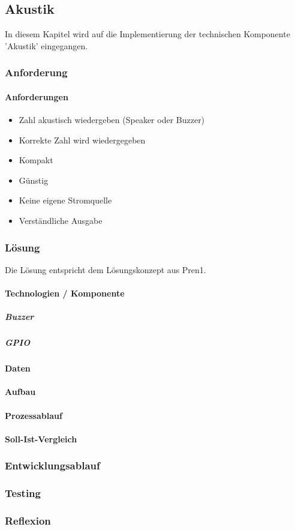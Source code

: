 \documentclass[../../main.tex]{subfiles}
\begin{document}
\subsection{Akustik}
In diesem Kapitel wird auf die Implementierung der technischen Komponente 'Akustik' eingegangen.
\subsubsection{Anforderung}

\paragraph{Anforderungen}
\begin{itemize}
    \item Zahl akustisch wiedergeben (Speaker oder Buzzer)
    \item Korrekte Zahl wird wiedergegeben
    \item Kompakt
    \item Günstig
    \item Keine eigene Stromquelle
    \item Verständliche Ausgabe
\end{itemize}

\subsubsection{Lösung}
Die Lösung entspricht dem Lösungskonzept aus Pren1. 

\paragraph{Technologien / Komponente}

\subparagraph{Buzzer}

\subparagraph{GPIO}

\paragraph{Daten}

\paragraph{Aufbau}

\paragraph{Prozessablauf}

\paragraph{Soll-Ist-Vergleich}

\subsubsection{Entwicklungsablauf}

\subsubsection{Testing}

\subsubsection{Reflexion}
\end{document}
